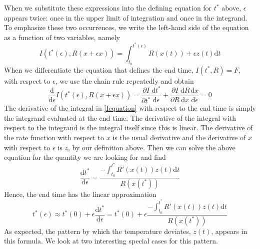 \documentclass[12 pt]{article}
\begin{document}
When we substitute these expressions into the defining equation for $t^*$ above, $\epsilon$ appears twice: once in the upper limit of integration and once in the integrand. To emphasize these two occurrences, we write the left-hand side of the equation as a function of two variables, namely
\begin{equation} \label{Iequation}
    I(t^*(\epsilon),R(x+\epsilon x)) = \int _{t_0} ^{t^*(\epsilon)} R(x(t))+\epsilon z(t) \mathrm{d}t \tag{Eq. \theequation}
\end{equation}
When we differentiate the equation that defines the end time, $I(t^* ,R)=F$, with respect to $\epsilon$, we use the chain rule repeatedly and obtain
\begin{equation} 
    \frac{\mathrm{d}}{\mathrm{d}\epsilon}I(t^*(\epsilon),R(x+\epsilon x)) = \frac{\partial I}{\partial t^*} \frac{\mathrm{d}t^*}{\mathrm{d}\epsilon}+\frac{\partial I}{\partial R} \frac{\mathrm{d} R}{\mathrm{d} x} \frac{\mathrm{d}x}{\mathrm{d}\epsilon} = 0 \tag{Eq. \theequation}
\end{equation}
The derivative of the integral in \ref{Iequation} with respect to the end time is simply the integrand evaluated at the end time. The derivative of the integral with respect to the integrand is the integral itself since this is linear. The derivative of the rate function with respect to $x$ is the usual derivative and the derivative of $x$ with respect to $\epsilon$ is $z$, by our definition above. Then we can solve the above equation for the quantity we are looking for and find
\begin{equation} \label{dtdepsilon}
    \frac{\mathrm{d}t^*}{\mathrm{d}\epsilon}=\frac{- \int _{t_0} ^{t^*} R'(x(t)) z(t) \tag{Eq. \theequation} \mathrm{d}t}{R(x(t^*))}
\end{equation}
Hence, the end time has the linear approximation
\begin{equation}
    t^*(\epsilon) \approx t^*(0)+\epsilon \frac{\mathrm{d}t^*}{\mathrm{d}\epsilon}=t^*(0)+\epsilon \frac{- \int _{t_0} ^{t^*} R'(x(t)) z(t) \mathrm{d}t}{R(x(t^*))} \tag{Eq. \theequation}
\end{equation}
As expected, the pattern by which the temperature deviates, $z(t)$, appears in this formula. We look at two interesting special cases for this pattern. \par
\end{document}
